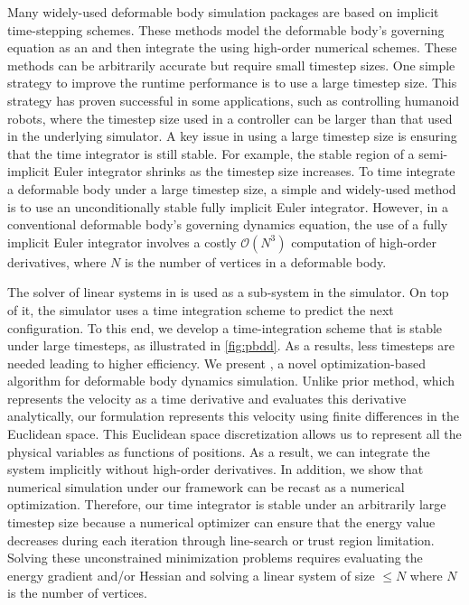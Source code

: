 Many widely-used deformable body simulation packages are based on implicit time-stepping schemes. These methods model the deformable body's governing equation as an  and then integrate the  using high-order numerical schemes. These methods can be arbitrarily accurate but require small timestep sizes. One simple strategy to improve the runtime performance is to use a large timestep size. This strategy has proven successful in some applications, such as controlling humanoid robots, where the timestep size used in a controller can be larger than that used in the underlying simulator. A key issue in using a large timestep size is ensuring that the time integrator is still stable. For example, the stable region of a semi-implicit Euler integrator shrinks as the timestep size increases. To time integrate a deformable body under a large timestep size, a simple and widely-used method is to use an unconditionally stable fully implicit Euler integrator. However, in a conventional deformable body's governing dynamics equation, the use of a fully implicit Euler integrator involves a costly $\mathcal{O}(N^3)$ computation of high-order derivatives, where $N$ is the number of vertices in a deformable body.

The solver of linear systems in  is used as a sub-system in the simulator. On top of it, the simulator uses a time integration scheme to predict the next configuration. To this end, we develop a time-integration scheme that is stable under large timesteps, as illustrated in \autoref{fig:pbdd}. As a results, less timesteps are needed leading to higher efficiency.  We present , a novel optimization-based algorithm for deformable body dynamics simulation. Unlike prior method, which represents the velocity as a time derivative and evaluates this derivative analytically, our  formulation represents this velocity using finite differences in the Euclidean space. This Euclidean space discretization allows us to represent all the physical variables as functions of positions. As a result, we can integrate the system implicitly without high-order derivatives. In addition, we show that numerical simulation under our  framework can be recast as a numerical optimization. Therefore, our time integrator is stable under an arbitrarily large timestep size because a numerical optimizer can ensure that the energy value decreases during each iteration through line-search or trust region limitation. Solving these unconstrained minimization problems requires evaluating the energy gradient and/or Hessian and solving a linear system of size $\leq N$ where $N$ is the number of vertices.

